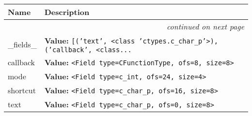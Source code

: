     \vspace{-1cm}
\hspace{\varindent}\begin{longtable}{|p{\varnamewidth}|p{\vardescrwidth}|l}
\cline{1-2}
\cline{1-2} \centering \textbf{Name} & \centering \textbf{Description}& \\
\cline{1-2}
\endhead\cline{1-2}\multicolumn{3}{r}{\small\textit{continued on next page}}\\\endfoot\cline{1-2}
\endlastfoot\raggedright \_\-f\-i\-e\-l\-d\-s\-\_\- & \raggedright \textbf{Value:} 
{\tt \texttt{[}\texttt{(}\texttt{'}\texttt{text}\texttt{'}\texttt{, }{\textless}class 'ctypes.c\_char\_p'{\textgreater}\texttt{)}\texttt{, }\texttt{(}\texttt{'}\texttt{callback}\texttt{'}\texttt{, }{\textless}class\texttt{...}}&\\
\cline{1-2}
\raggedright c\-a\-l\-l\-b\-a\-c\-k\- & \raggedright \textbf{Value:} 
{\tt {\textless}Field type=CFunctionType, ofs=8, size=8{\textgreater}}&\\
\cline{1-2}
\raggedright m\-o\-d\-e\- & \raggedright \textbf{Value:} 
{\tt {\textless}Field type=c\_int, ofs=24, size=4{\textgreater}}&\\
\cline{1-2}
\raggedright s\-h\-o\-r\-t\-c\-u\-t\- & \raggedright \textbf{Value:} 
{\tt {\textless}Field type=c\_char\_p, ofs=16, size=8{\textgreater}}&\\
\cline{1-2}
\raggedright t\-e\-x\-t\- & \raggedright \textbf{Value:} 
{\tt {\textless}Field type=c\_char\_p, ofs=0, size=8{\textgreater}}&\\
\cline{1-2}
\end{longtable}

